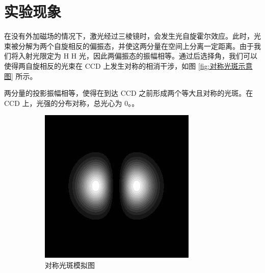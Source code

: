 \documentclass[12pt]{ctexart}
\numberwithin{equation}{section} %
\begin{document}
\section{实验现象}
在没有外加磁场的情况下，激光经过三棱镜时，会发生光自旋霍尔效应。此时，光束被分解为两个自旋相反的偏振态，并使这两分量在空间上分离一定距离。由于我们将入射光限定为 
H
H 光，因此两偏振态的振幅相等。通过后选择角，我们可以使得两自旋相反的光束在 CCD 上发生对称的相消干涉，如图 \ref{fig:对称光斑示意图} 所示。

两分量的投影振幅相等，使得在到达 CCD 之前形成两个等大且对称的光斑。在 CCD 上，光强的分布对称，总光心为 0。。
\begin{figure}[H] %
    \centering %
    \begin{subfigure}{0.3\textwidth} %
        \centering
        \includegraphics[width=\textwidth, trim=40pt 40pt 40pt 40pt, clip]{对称光斑模拟图.jpg} %
        \caption{对称光斑模拟图} %
        \label{fig:对称光斑模拟图} %
    \end{subfigure}
    \hspace{0.05\textwidth} %
    \begin{subfigure}{0.3\textwidth} %

\end{subfigure}
\end{figure}
\end{document}
